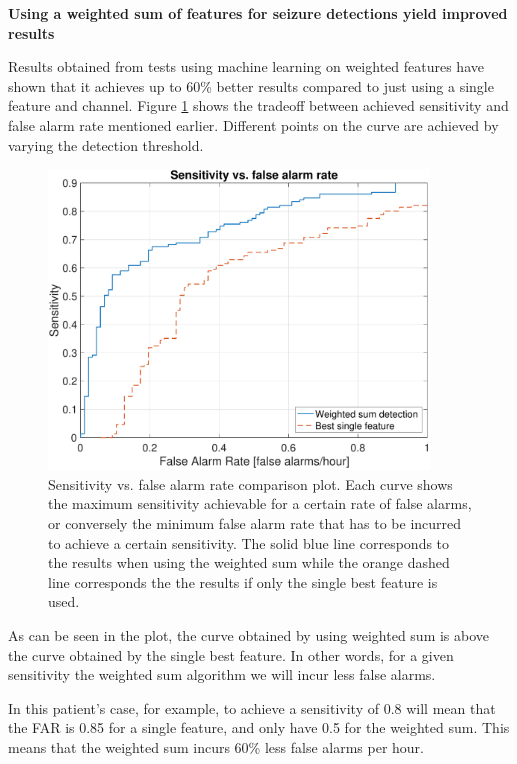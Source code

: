 \documentclass[usletter, 11pt]{extarticle}
\begin{document}
\vspace{11pt}
\textbf{Using a weighted sum of features for seizure detections yield improved results
}

Results obtained from tests using machine learning on weighted features have shown that it achieves up to 60\% better results compared to just using a single feature and channel. Figure \ref{fig:sensitivity_plot_OLS} shows the tradeoff between achieved sensitivity and false alarm rate mentioned earlier. Different points on the curve are achieved by varying the detection threshold.

\begin{figure}[!h]
	\centering
	\includegraphics[width = 0.9\textwidth]{img/sensitivity_plot}
	\caption{Sensitivity vs. false alarm rate comparison plot. Each curve shows the maximum sensitivity achievable for a certain rate of false alarms, or conversely the minimum false alarm rate that has to be incurred to achieve a certain sensitivity. The solid blue line corresponds to the results when using the weighted sum while the orange dashed line corresponds the the results if only the single best feature is used.}
	\label{fig:sensitivity_plot_OLS}
\end{figure}

As can be seen in the plot, the curve obtained by using weighted sum is above the curve obtained by the single best feature. In other words, for a given sensitivity the weighted sum algorithm we will incur less false alarms.
 
In this patient’s case, for example, to achieve a sensitivity of 0.8 will mean that the FAR is 0.85 for a single feature, and only have 0.5 for the weighted sum. This means that the weighted sum incurs 60\% less false alarms per hour.
\end{document}
